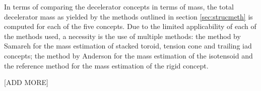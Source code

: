 In terms of comparing the decelerator concepts in terms of mass, the total decelerator mass as yielded by the methods outlined in section \ref{sec:strucmeth} is computed for each of the five concepts. Due to the limited applicability of each of the methods used, a necessity is the use of multiple methods: the method by Samareh \cite{Samareh2011} for the mass estimation of stacked toroid, tension cone and trailing \gls{iad} concepts; the method by Anderson \cite{Anderson1969} for the mass estimation of the isotensoid and the reference method for the mass estimation of the rigid concept. 

[ADD MORE]